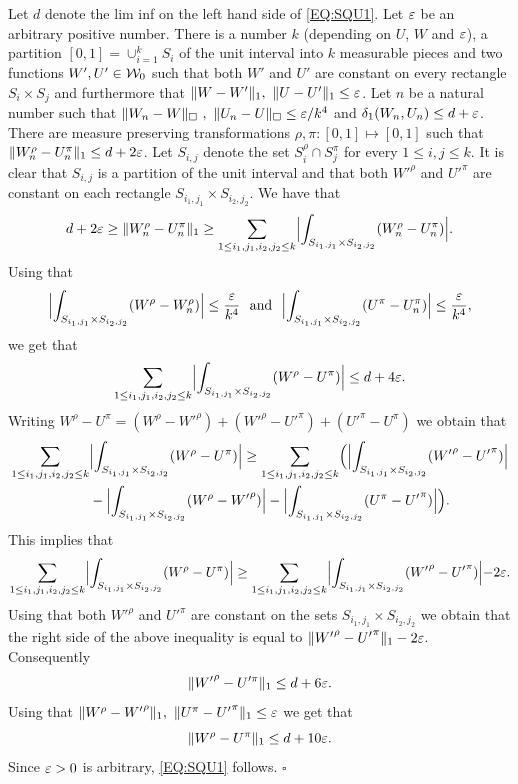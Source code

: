 \documentclass{article}
\newenvironment{proof}{\medskip\noindent{\bf Proof. }}{\hfill$\square$\medskip}
\begin{document}
\begin{proof}
Let $d$ denote the lim inf on the left hand side of \eqref{EQ:SQU1}.
Let $\varepsilon$ be an arbitrary positive number. There is a number $k$
(depending on $U$, $W$ and $\varepsilon$), a partition $[0,1]=\cup_{i=1}^k
S_i$ of the unit interval into $k$ measurable pieces and two
functions $W',U'\in\mathcal{W}_0$ such that both $W'$ and $U'$ are constant
on every rectangle $S_i\times S_j$ and furthermore that $\|W-W'\|_1,
~ \|U-U'\|_1\leq\varepsilon$. Let $n$ be a natural number such that $\|
W_n-W\|_\square ~,~ \| U_n-U\|_\square\leq\varepsilon/k^4$ and
$\delta_1(W_n,U_n)\le d+\varepsilon$. There are measure preserving
transformations $\rho,\pi:[0,1]\mapsto [0,1]$ such that
$\|W_n^{\rho}-U_n^{\pi}\|_1\leq d+2\varepsilon$. Let $S_{i,j}$ denote the
set $S_i^{\rho}\cap S_j^{\pi}$ for every $1\leq i,j\leq k$. It is
clear that $S_{i,j}$ is a partition of the unit interval and that
both ${W'}^{\rho}$ and ${U'}^{\pi}$ are constant on each rectangle
$S_{i_1,j_1}\times S_{i_2,j_2}$. We have that
\[
d+2\varepsilon\ge \| W_n^{\rho}-U_n^{\pi}\|_1\ge \sum_{1\leq
i_1,j_1,i_2,j_2\leq k}\Bigl|\int_{S_{i_1,j_1} \times
S_{i_2,j_2}}(W_n^{\rho}-U_n^{\pi})\Bigr|.
\]
Using that
\[
\Bigl|\int_{S_{i_1,j_1}\times S_{i_2,j_2}} (W^{\rho}-W_n^{\rho})
\Bigr|\le \frac{\varepsilon}{k^4}
~~\text{and}~~\Bigl|\int_{S_{i_1,j_1}\times S_{i_2,j_2}}
(U^{\pi}-U_n^{\pi})\Bigr|\le \frac{\varepsilon}{k^4},
\]
we get that
\[
\sum_{1\leq i_1,j_1,i_2,j_2\leq k}\Bigl|\int_{S_{i_1,j_1}\times
S_{i_2,j_2}}(W^{\rho}-U^{\pi})\Bigr|\le d+4\varepsilon.
\]
Writing
$W^{\rho}-U^{\pi}=(W^{\rho}-{W'}^{\rho})+({W'}^{\rho}-U'^{\pi})
+(U'^{\pi}-U^{\pi})$ we obtain that
\begin{align*}
\sum_{1\leq i_1,j_1,i_2,j_2\leq k}&\Bigl|\int_{S_{i_1,j_1}\times
S_{i_2,j_2}}(W^{\rho}-U^{\pi})\Bigr|\geq \sum_{1\leq
i_1,j_1,i_2,j_2\leq k}\Bigl(\Bigl|\int_{S_{i_1,j_1}\times
S_{i_2,j_2}} ({W'}^{\rho}-{U'}^{\pi})\Bigl|\\&-
\Bigl|\int_{S_{i_1,j_1}\times S_{i_2,j_2}}
(W^{\rho}-{W'}^{\rho})\Bigr|-\Bigl|\int_{S_{i_1,j_1}\times
S_{i_2,j_2}} (U^{\pi}-{U'}^{\pi})\Bigr|\Bigr).
\end{align*}
This implies that
\[
\sum_{1\leq i_1,j_1,i_2,j_2\leq k}\Bigl|\int_{S_{i_1,j_1}\times
S_{i_2,j_2}}(W^{\rho}-U^{\pi})\Bigr|\ge \sum_{1\leq
i_1,j_1,i_2,j_2\leq k}\Bigl|\int_{S_{i_1,j_1}\times S_{i_2,j_2}}
({W'}^{\rho}-{U'}^{\pi})\Bigl|-2\varepsilon.
\]
Using that both ${W'}^{\rho}$ and ${U'}^{\pi}$ are constant on the
sets $S_{i_1,j_1}\times S_{i_2,j_2}$ we obtain that the right side of
the above inequality is equal to
$\|{W'}^{\rho}-{U'}^{\pi}\|_1-2\varepsilon$. Consequently
\[
\| {W'}^{\rho}-U'^{\pi}\|_1\leq d+6\varepsilon.
\]
Using that $\| W^{\rho}-{W'}^{\rho}\|_1,~\|U^{\pi}-{U'}^{\pi}\|_1\le
\varepsilon$ we get that
\[
\|W^{\rho}-U^{\pi}\|_1\leq d+10\varepsilon.
\]
Since $\varepsilon>0$ is arbitrary, \eqref{EQ:SQU1} follows.
\end{proof}
\end{document}
